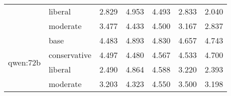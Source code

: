 \begin{table}
\begin{tabular}{llrrrrr}
 & liberal & 2.829 & 4.953 & 4.493 & 2.833 & 2.040 \\
 & moderate & 3.477 & 4.433 & 4.500 & 3.167 & 2.837 \\
\cline{1-7}
\multirow[t]{4}{*}{qwen:72b} & base & 4.483 & 4.893 & 4.830 & 4.657 & 4.743 \\
 & conservative & 4.497 & 4.480 & 4.567 & 4.533 & 4.700 \\
 & liberal & 2.490 & 4.864 & 4.588 & 3.220 & 2.393 \\
 & moderate & 3.203 & 4.323 & 4.550 & 3.500 & 3.198 \\
\cline{1-7}
\bottomrule
\end{tabular}
\end{table}
